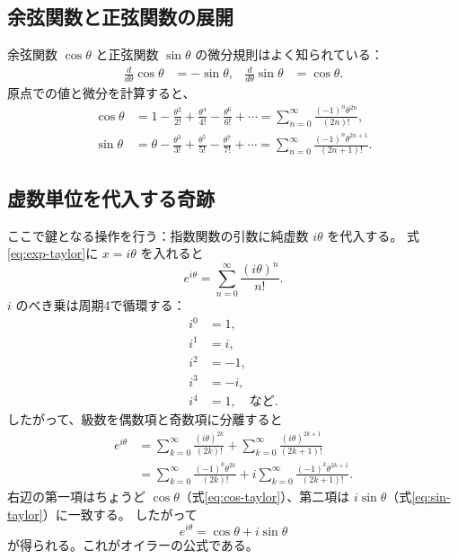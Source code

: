\documentclass[dvipdfmx,a4paper]{jsbook}
\theoremstyle{definition}
\theoremstyle{remark}
\begin{document}
\subsection{余弦関数と正弦関数の展開}

余弦関数 $\cos\theta$ と正弦関数 $\sin\theta$ の微分規則はよく知られている：
\begin{align}
  \frac{d}{d\theta} \cos\theta &= -\sin\theta, &
  \frac{d}{d\theta} \sin\theta &= \cos\theta.
\end{align}
原点での値と微分を計算すると、
\begin{align}
  \cos\theta &= 1 - \frac{\theta^2}{2!} + \frac{\theta^4}{4!} - \frac{\theta^6}{6!} + \cdots
              = \sum_{n=0}^\infty \frac{(-1)^n \theta^{2n}}{(2n)!},
  \label{eq:cos-taylor} \\
  \sin\theta &= \theta - \frac{\theta^3}{3!} + \frac{\theta^5}{5!} - \frac{\theta^7}{7!} + \cdots
              = \sum_{n=0}^\infty \frac{(-1)^n \theta^{2n+1}}{(2n+1)!}.
  \label{eq:sin-taylor}
\end{align}

\subsection{虚数単位を代入する奇跡}

ここで鍵となる操作を行う：指数関数の引数に純虚数 $i\theta$ を代入する。
式\eqref{eq:exp-taylor}に $x = i\theta$ を入れると
\begin{equation}
  e^{i\theta} = \sum_{n=0}^\infty \frac{(i\theta)^n}{n!}.
\end{equation}
$i$ のべき乗は周期4で循環する：
\begin{align*}
  i^0 &= 1, \\
  i^1 &= i, \\
  i^2 &= -1, \\
  i^3 &= -i, \\
  i^4 &= 1, \quad \text{など}.
\end{align*}
したがって、級数を偶数項と奇数項に分離すると
\begin{align*}
  e^{i\theta} &= \sum_{k=0}^\infty \frac{(i\theta)^{2k}}{(2k)!}
                + \sum_{k=0}^\infty \frac{(i\theta)^{2k+1}}{(2k+1)!} \\
              &= \sum_{k=0}^\infty \frac{(-1)^k \theta^{2k}}{(2k)!}
                + i \sum_{k=0}^\infty \frac{(-1)^k \theta^{2k+1}}{(2k+1)!}.
\end{align*}
右辺の第一項はちょうど $\cos\theta$（式\eqref{eq:cos-taylor}）、第二項は $i\sin\theta$（式\eqref{eq:sin-taylor}）に一致する。
したがって
\begin{equation}
  \boxed{e^{i\theta} = \cos\theta + i\sin\theta}
  \label{eq:euler-formula}
\end{equation}
が得られる。これがオイラーの公式である。
\end{document}

